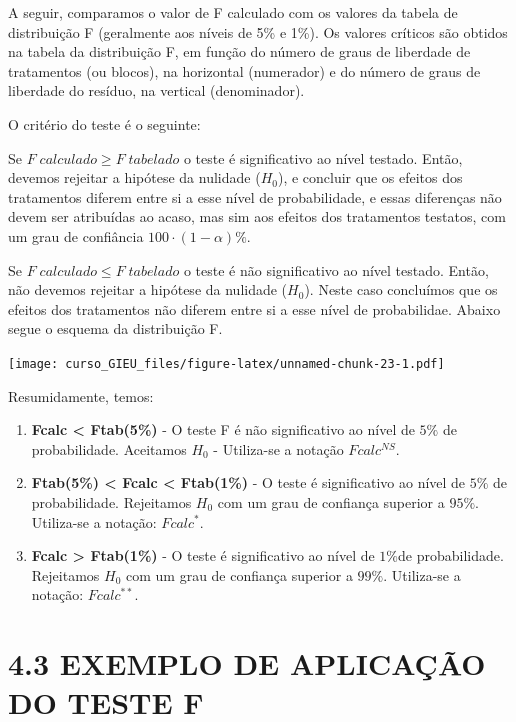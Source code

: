 \documentclass[
]{book}
\begin{document}
A seguir, comparamos o valor de F calculado com os valores da tabela de distribuição F (geralmente aos níveis de 5\% e 1\%). Os valores críticos são obtidos na tabela da distribuição F, em função do número de graus de liberdade de tratamentos (ou blocos), na horizontal (numerador) e do número de graus de liberdade do resíduo, na vertical (denominador).

O critério do teste é o seguinte:

Se \(F\;calculado \ge F\;tabelado\) o teste é significativo ao nível testado. Então, devemos rejeitar a hipótese da nulidade (\(H_0\)), e concluir que os efeitos dos tratamentos diferem entre si a esse nível de probabilidade, e essas diferenças não devem ser atribuídas ao acaso, mas sim aos efeitos dos tratamentos testatos, com um grau de confiância \(100 \cdot(1-\alpha)\%\).

Se \(F\;calculado \le F\;tabelado\) o teste é não significativo ao nível testado. Então, não devemos rejeitar a hipótese da nulidade (\(H_0\)). Neste caso concluímos que os efeitos dos tratamentos não diferem entre si a esse nível de probabilidae. Abaixo segue o esquema da distribuição F.

\texttt{[image: curso\_GIEU\_files/figure-latex/unnamed-chunk-23-1.pdf]}

Resumidamente, temos:

\begin{enumerate}
\def\labelenumi{\alph{enumi})}
\item
  \textbf{Fcalc \textless{} Ftab(5\%)} - O teste F é não significativo ao nível de \(5\%\) de probabilidade. Aceitamos \(H_0\) - Utiliza-se a notação \(Fcalc^{NS}\).
\item
  \textbf{Ftab(5\%) \textless{} Fcalc \textless{} Ftab(1\%)} - O teste é significativo ao nível de \(5\%\) de probabilidade. Rejeitamos \(H_0\) com um grau de confiança superior a \(95\%\). Utiliza-se a notação: \(Fcalc^*\).
\item
  \textbf{Fcalc \textgreater{} Ftab(1\%)} - O teste é significativo ao nível de \(1\%\)de probabilidade. Rejeitamos \(H_0\) com um grau de confiança superior a \(99\%\). Utiliza-se a notação: \(Fcalc^{**}\).
\end{enumerate}

\hypertarget{exemplo-de-aplicauxe7uxe3o-do-teste-f}{%
\section{4.3 EXEMPLO DE APLICAÇÃO DO TESTE F}\label{exemplo-de-aplicauxe7uxe3o-do-teste-f}}
\end{document}
